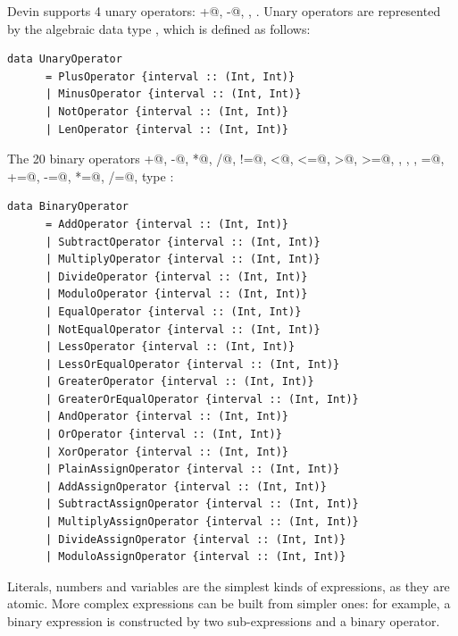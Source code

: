 \documentclass[UdineBachThesis,american,11pt]{PhdThesis}
\begin{document}
  Devin supports 4 unary operators: \lstinline@+@, \lstinline@-@,
  \lstinline@not@, \lstinline@len@. Unary operators are represented by the
  algebraic data type \lstinline@UnaryOperator@, which is defined as follows:

  \begin{lstlisting}[gobble=4,basicstyle=\ttfamily\small]
    data UnaryOperator
      = PlusOperator {interval :: (Int, Int)}
      | MinusOperator {interval :: (Int, Int)}
      | NotOperator {interval :: (Int, Int)}
      | LenOperator {interval :: (Int, Int)}
  \end{lstlisting}

  The 20 binary operators \lstinline@+@, \lstinline@-@, \lstinline@*@,
  \lstinline@/@, \lstinline@%@, \lstinline@==@,
  \lstinline@!=@, \lstinline@<@, \lstinline@<=@, \lstinline@>@, \lstinline@>=@,
  \lstinline@and@, \lstinline@or@, \lstinline@xor@, \lstinline@=@,
  \lstinline@+=@, \lstinline@-=@, \lstinline@*=@, \lstinline@/=@,
  \lstinline@%=@ are represented by the
  type \lstinline@BinaryOperator@:

  \begin{lstlisting}[gobble=4,basicstyle=\ttfamily\small]
    data BinaryOperator
      = AddOperator {interval :: (Int, Int)}
      | SubtractOperator {interval :: (Int, Int)}
      | MultiplyOperator {interval :: (Int, Int)}
      | DivideOperator {interval :: (Int, Int)}
      | ModuloOperator {interval :: (Int, Int)}
      | EqualOperator {interval :: (Int, Int)}
      | NotEqualOperator {interval :: (Int, Int)}
      | LessOperator {interval :: (Int, Int)}
      | LessOrEqualOperator {interval :: (Int, Int)}
      | GreaterOperator {interval :: (Int, Int)}
      | GreaterOrEqualOperator {interval :: (Int, Int)}
      | AndOperator {interval :: (Int, Int)}
      | OrOperator {interval :: (Int, Int)}
      | XorOperator {interval :: (Int, Int)}
      | PlainAssignOperator {interval :: (Int, Int)}
      | AddAssignOperator {interval :: (Int, Int)}
      | SubtractAssignOperator {interval :: (Int, Int)}
      | MultiplyAssignOperator {interval :: (Int, Int)}
      | DivideAssignOperator {interval :: (Int, Int)}
      | ModuloAssignOperator {interval :: (Int, Int)}
  \end{lstlisting}

  Literals, numbers and variables are the simplest kinds of expressions, as they
  are atomic. More complex expressions can be built from simpler ones: for
  example, a binary expression is constructed by two sub-expressions and a
  binary operator.
\end{document}
